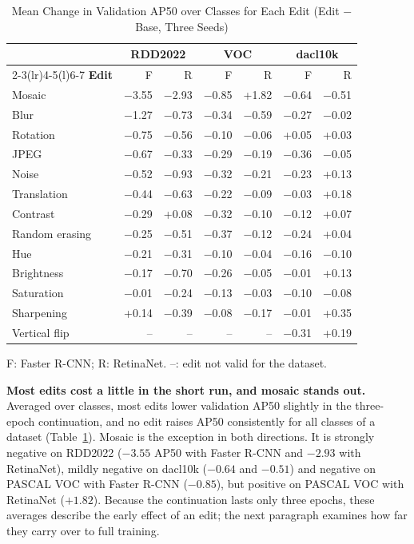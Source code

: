\documentclass[conference]{IEEEtran}
\begin{document}
\begin{table}[t]
\caption{Mean Change in Validation AP50 over Classes for Each Edit (Edit $-$ Base, Three Seeds)}
\label{tab:mean_effects}
\centering
\footnotesize
\setlength{\tabcolsep}{3.2pt}
\begin{tabular}{@{}lrrrrrr@{}}
\toprule
 & \multicolumn{2}{c}{\textbf{RDD2022}} & \multicolumn{2}{c}{\textbf{VOC}} & \multicolumn{2}{c}{\textbf{dacl10k}} \\
\cmidrule(lr){2-3}\cmidrule(lr){4-5}\cmidrule(l){6-7}
\textbf{Edit} & F & R & F & R & F & R \\
\midrule
Mosaic & $-$3.55 & $-$2.93 & $-$0.85 & +1.82 & $-$0.64 & $-$0.51 \\
Blur & $-$1.27 & $-$0.73 & $-$0.34 & $-$0.59 & $-$0.27 & $-$0.02 \\
Rotation & $-$0.75 & $-$0.56 & $-$0.10 & $-$0.06 & +0.05 & +0.03 \\
JPEG & $-$0.67 & $-$0.33 & $-$0.29 & $-$0.19 & $-$0.36 & $-$0.05 \\
Noise & $-$0.52 & $-$0.93 & $-$0.32 & $-$0.21 & $-$0.23 & +0.13 \\
Translation & $-$0.44 & $-$0.63 & $-$0.22 & $-$0.09 & $-$0.03 & +0.18 \\
Contrast & $-$0.29 & +0.08 & $-$0.32 & $-$0.10 & $-$0.12 & +0.07 \\
Random erasing & $-$0.25 & $-$0.51 & $-$0.37 & $-$0.12 & $-$0.24 & +0.04 \\
Hue & $-$0.21 & $-$0.31 & $-$0.10 & $-$0.04 & $-$0.16 & $-$0.10 \\
Brightness & $-$0.17 & $-$0.70 & $-$0.26 & $-$0.05 & $-$0.01 & +0.13 \\
Saturation & $-$0.01 & $-$0.24 & $-$0.13 & $-$0.03 & $-$0.10 & $-$0.08 \\
Sharpening & +0.14 & $-$0.39 & $-$0.08 & $-$0.17 & $-$0.01 & +0.35 \\
Vertical flip & -- & -- & -- & -- & $-$0.31 & +0.19 \\
\bottomrule
\end{tabular}
\vspace{2pt}

\parbox{\columnwidth}{\footnotesize F: Faster R-CNN; R: RetinaNet. --: edit not valid for the dataset.}
\end{table}

\noindent\textbf{Most edits cost a little in the short run, and mosaic stands out.} Averaged over classes, most edits lower validation AP50 slightly in the three-epoch continuation, and no edit raises AP50 consistently for all classes of a dataset (Table~\ref{tab:mean_effects}). Mosaic is the exception in both directions. It is strongly negative on RDD2022 ($-3.55$ AP50 with Faster R-CNN and $-2.93$ with RetinaNet), mildly negative on dacl10k ($-0.64$ and $-0.51$) and negative on PASCAL VOC with Faster R-CNN ($-0.85$), but positive on PASCAL VOC with RetinaNet ($+1.82$). Because the continuation lasts only three epochs, these averages describe the early effect of an edit; the next paragraph examines how far they carry over to full training.
\end{document}
